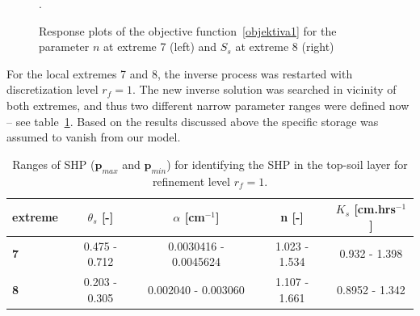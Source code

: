 \documentclass[review,times,3p,twocolumn,10pt]{elsarticle}
\renewcommand{\vec}{\mathbf}
\newcommand{\fs}{\footnotesize}
\begin{document}
\begin{figure}
\caption{Response plots of the objective function~\eqref{objektiva1} for the parameter $n$ at extreme 7 (left)  and $S_s$ at extreme 8  (right)}.
\label{objfnc6.2}
\end{figure}

For the local extremes 7 and 8, the inverse process was restarted with discretization level $r_f=1$. 
The new inverse solution was searched in  vicinity of both extremes, and thus two different narrow parameter ranges were defined now -- see table~\ref{rozsahy2}. Based on the results discussed above the specific storage was assumed to vanish from our model. 


\begin{table}[ht]
\begin{center}
\caption{Ranges of SHP ($\vec{p}_{max}$ and $\vec{p}_{min}$) for identifying the SHP in the top-soil layer for { refinement level} $r_f=1$. }
\fs
\begin{tabular}{ l || c | c| c| c }
\toprule
extreme & $\theta_s$ [-]&$\alpha$ [cm$^{-1}$]&n [-]& $K_s$ [cm.hrs$^{-1}$]  \\ \hline
\toprule
{\bf 7} & 0.475 - 0.712 & \num{.0030416} - \num{.0045624} & 1.023 - 1.534 & 0.932 - 1.398 \\
{\bf 8} & 0.203 - 0.305 & \num{.002040} - \num{.003060} & 1.107 - 1.661 & 0.8952 - 1.342  \\
\toprule
\end{tabular}
\label{rozsahy2}
\end{center}
\end{table}
\end{document}
